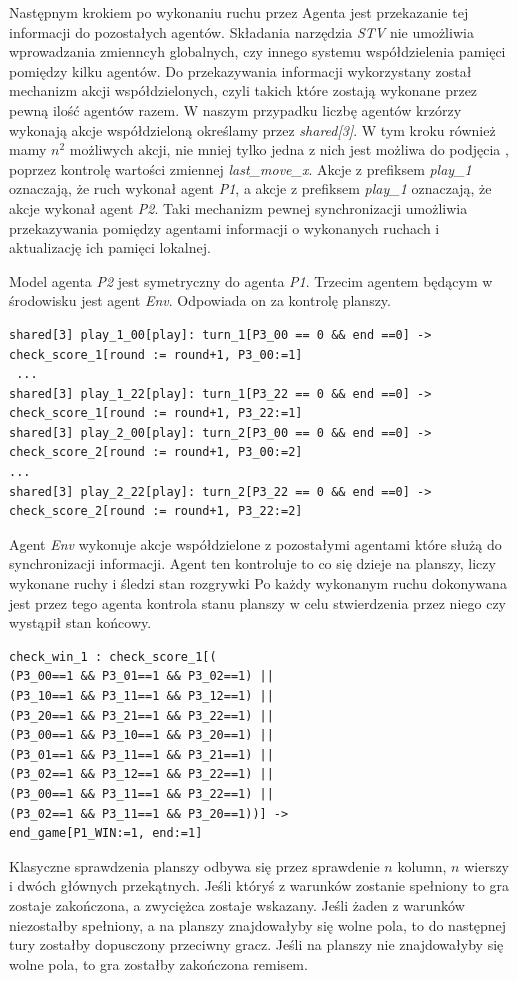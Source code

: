 Następnym krokiem po wykonaniu ruchu przez Agenta jest przekazanie tej informacji do 
pozostałych agentów. Składania narzędzia \textit{STV} nie umożliwia wprowadzania zmienncyh 
globalnych, czy innego systemu współdzielenia pamięci pomiędzy kilku agentów. Do przekazywania 
informacji wykorzystany został mechanizm akcji współdzielonych, czyli takich które 
zostają wykonane przez pewną ilość agentów razem. W naszym przypadku liczbę agentów 
krzórzy wykonają akcje współdzieloną określamy przez \textit{shared[3]}. W tym 
kroku również mamy $n^{2}$ możliwych akcji, nie mniej tylko jedna z nich jest możliwa do podjęcia
, poprzez kontrolę wartości zmiennej \textit{last\_move\_x}. Akcje z prefiksem \textit{play\_1}
oznaczają, że ruch wykonał agent \textit{P1}, a akcje z prefiksem \textit{play\_1}
oznaczają, że akcje wykonał agent  \textit{P2}. Taki mechanizm pewnej synchronizacji 
umożliwia przekazywania pomiędzy agentami informacji o wykonanych ruchach i aktualizację 
ich pamięci lokalnej.

Model agenta \textit{P2} jest symetryczny do agenta \textit{P1}. Trzecim agentem 
będącym w środowisku jest agent \textit{Env}. Odpowiada on za kontrolę planszy.

\begin{lstlisting}[language={}]
shared[3] play_1_00[play]: turn_1[P3_00 == 0 && end ==0] -> 
check_score_1[round := round+1, P3_00:=1]
 ... 
shared[3] play_1_22[play]: turn_1[P3_22 == 0 && end ==0] -> 
check_score_1[round := round+1, P3_22:=1]
shared[3] play_2_00[play]: turn_2[P3_00 == 0 && end ==0] -> 
check_score_2[round := round+1, P3_00:=2]
...
shared[3] play_2_22[play]: turn_2[P3_22 == 0 && end ==0] -> 
check_score_2[round := round+1, P3_22:=2]
\end{lstlisting}

Agent \textit{Env} wykonuje akcje współdzielone z pozostałymi agentami które
służą do synchronizacji informacji. Agent ten kontroluje to co się dzieje na planszy, 
liczy wykonane ruchy i śledzi stan rozgrywki
Po każdy wykonanym ruchu dokonywana jest przez tego agenta kontrola stanu planszy 
w celu stwierdzenia przez niego czy wystąpił stan końcowy.
\begin{lstlisting}[language={}]
check_win_1 : check_score_1[(
(P3_00==1 && P3_01==1 && P3_02==1) || 
(P3_10==1 && P3_11==1 && P3_12==1) || 
(P3_20==1 && P3_21==1 && P3_22==1) ||
(P3_00==1 && P3_10==1 && P3_20==1) || 
(P3_01==1 && P3_11==1 && P3_21==1) || 
(P3_02==1 && P3_12==1 && P3_22==1) || 
(P3_00==1 && P3_11==1 && P3_22==1) || 
(P3_02==1 && P3_11==1 && P3_20==1))] -> 
end_game[P1_WIN:=1, end:=1]
\end{lstlisting}
Klasyczne sprawdzenia planszy odbywa się przez sprawdenie $n$ kolumn, $n$ wierszy i dwóch 
głównych przekątnych. Jeśli któryś z warunków zostanie spełniony to gra zostaje 
zakończona, a zwyciężca zostaje wskazany. Jeśli żaden z warunków niezostałby spełniony, 
a na planszy znajdowałyby się wolne pola, to do następnej tury zostałby dopusczony przeciwny gracz.
Jeśli na planszy nie znajdowałyby się wolne pola, to gra zostałby zakończona remisem.


